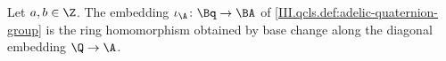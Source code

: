 Let $a,b\in\Z$. The embedding $\iota_\A\colon\Bq\to\BA$ of \cref{III.qcls.def:adelic-quaternion-group} is the ring homomorphism obtained by base change along the
diagonal embedding $\Q\to\A$.
